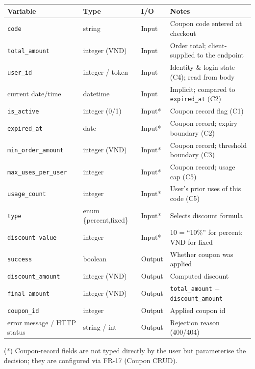 \documentclass[11pt,a4paper]{article}
\newcommand{\code}[1]{\texttt{#1}}
\newcommand{\dong}{VND} %
\begin{document}
\begin{center}
\begin{longtable}{@{}L{3.3cm} L{2.6cm} C{1.7cm} L{6.5cm}@{}}
\toprule
\textbf{Variable} & \textbf{Type} & \textbf{I/O} & \textbf{Notes} \\
\midrule
\endhead
\code{code}              & string             & Input  & Coupon code entered at checkout \\
\code{total\_amount}     & integer (\dong)    & Input  & Order total; client-supplied to the endpoint \\
\code{user\_id}          & integer / token    & Input  & Identity \& login state (C4); read from body \\
current date/time        & datetime           & Input  & Implicit; compared to \code{expired\_at} (C2) \\
\code{is\_active}        & integer (0/1)      & Input* & Coupon record flag (C1) \\
\code{expired\_at}       & date               & Input* & Coupon record; expiry boundary (C2) \\
\code{min\_order\_amount}& integer (\dong)    & Input* & Coupon record; threshold boundary (C3) \\
\code{max\_uses\_per\_user}& integer          & Input* & Coupon record; usage cap (C5) \\
\code{usage\_count}      & integer            & Input* & User's prior uses of this code (C5) \\
\code{type}              & enum \{percent,fixed\} & Input* & Selects discount formula \\
\code{discount\_value}   & integer            & Input* & 10 = ``10\%'' for percent; \dong{} for fixed \\
\midrule
\code{success}           & boolean            & Output & Whether coupon was applied \\
\code{discount\_amount}  & integer (\dong)    & Output & Computed discount \\
\code{final\_amount}     & integer (\dong)    & Output & \code{total\_amount} $-$ \code{discount\_amount} \\
\code{coupon\_id}        & integer            & Output & Applied coupon id \\
error message / HTTP status & string / int    & Output & Rejection reason (400/404) \\
\bottomrule
\end{longtable}
\end{center}
\noindent\footnotesize (*) Coupon-record fields are not typed directly by the user but
parameterise the decision; they are configured via FR-17 (Coupon CRUD).\normalsize
\end{document}
